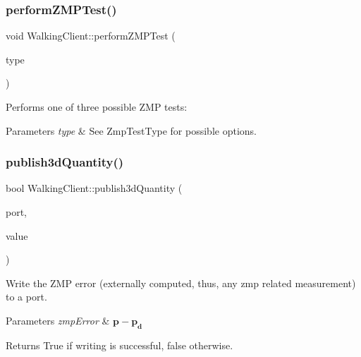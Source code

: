 \subsubsection{\texorpdfstring{perform\+Z\+M\+P\+Test()}{performZMPTest()}}
{\footnotesize\ttfamily void Walking\+Client\+::perform\+Z\+M\+P\+Test (\begin{DoxyParamCaption}\item[{\hyperlink{WalkingClient_8h_afc01479a47f5a87462a54b6a9e11fffa}{Zmp\+Test\+Type}}]{type }\end{DoxyParamCaption})}

Performs one of three possible Z\+MP tests\+:


\begin{DoxyParams}{Parameters}
{\em type} & See Zmp\+Test\+Type for possible options. \\
\hline
\end{DoxyParams}
\hypertarget{classWalkingClient_ae6d6c046a9a3e51771afe8b4c105b412}{}\label{classWalkingClient_ae6d6c046a9a3e51771afe8b4c105b412} 
\subsubsection{\texorpdfstring{publish3d\+Quantity()}{publish3dQuantity()}}
{\footnotesize\ttfamily bool Walking\+Client\+::publish3d\+Quantity (\begin{DoxyParamCaption}\item[{yarp\+::os\+::\+Buffered\+Port$<$ yarp\+::os\+::\+Bottle $>$ \&}]{port,  }\item[{Eigen\+::\+Vector3d \&}]{value }\end{DoxyParamCaption})}

Write the Z\+MP error (externally computed, thus, any zmp related measurement) to a port.


\begin{DoxyParams}{Parameters}
{\em zmp\+Error} & $\mathbf{p} - \mathbf{p_d}$\\
\hline
\end{DoxyParams}
\begin{DoxyReturn}{Returns}
True if writing is successful, false otherwise. 
\end{DoxyReturn}
\hypertarget{classWalkingClient_a03ea2313c954a97aeb4d5b614f3e6caa}{}\label{classWalkingClient_a03ea2313c954a97aeb4d5b614f3e6caa} 
